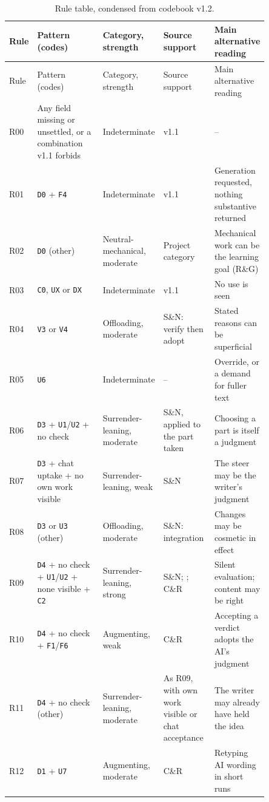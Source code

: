 \documentclass[manuscript,screen]{acmart}
\newcommand{\code}[1]{\texttt{#1}}
\begin{document}
{\small
\begin{longtable}{p{0.05\linewidth}p{0.27\linewidth}p{0.13\linewidth}p{0.20\linewidth}p{0.20\linewidth}}
\caption{Rule table, condensed from codebook v1.2.}\\
\toprule
Rule & Pattern (codes) & Category, strength & Source support & Main alternative reading \\
\midrule
\endfirsthead
\toprule
Rule & Pattern (codes) & Category, strength & Source support & Main alternative reading \\
\midrule
\endhead
R00 & Any field missing or unsettled, or a combination v1.1 forbids & Indeterminate & v1.1 & -- \\
R01 & \code{D0} + \code{F4} & Indeterminate & v1.1 & Generation requested, nothing substantive returned \\
R02 & \code{D0} (other) & Neutral-mechanical, moderate & Project category & Mechanical work can be the learning goal (R\&G) \\
R03 & \code{C0}, \code{UX} or \code{DX} & Indeterminate & v1.1 & No use is seen \\
R04 & \code{V3} or \code{V4} & Offloading, moderate & S\&N: verify then adopt & Stated reasons can be superficial \cite{tao2026} \\
R05 & \code{U6} & Indeterminate & -- & Override, or a demand for fuller text \\
R06 & \code{D3} + \code{U1}/\code{U2} + no check & Surrender-leaning, moderate & S\&N, applied to the part taken & Choosing a part is itself a judgment \\
R07 & \code{D3} + chat uptake + no own work visible & Surrender-leaning, weak & S\&N & The steer may be the writer's judgment \\
R08 & \code{D3} or \code{U3} (other) & Offloading, moderate & S\&N: integration & Changes may be cosmetic in effect \\
R09 & \code{D4} + no check + \code{U1}/\code{U2} + none visible + \code{C2} & Surrender-leaning, strong & S\&N; \cite{bastani2025}; C\&R & Silent evaluation; content may be right \\
R10 & \code{D4} + no check + \code{F1}/\code{F6} & Augmenting, weak & C\&R & Accepting a verdict adopts the AI's judgment \\
R11 & \code{D4} + no check (other) & Surrender-leaning, moderate & As R09, with own work visible or chat acceptance & The writer may already have held the idea \\
R12 & \code{D1} + \code{U7} & Augmenting, moderate & C\&R & Retyping AI wording in short runs \\

\end{longtable}}
\end{document}
